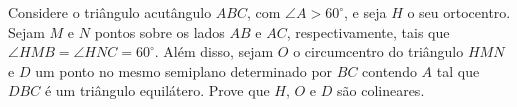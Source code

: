 Considere o triângulo acutângulo $ABC$, com $\angle A > 60^\circ$, e seja $H$ o seu ortocentro.
Sejam $M$ e $N$ pontos sobre os lados $AB$ e $AC$, respectivamente, tais que $\angle HMB = \angle HNC = 60^\circ$.
Além disso, sejam $O$ o circumcentro do triângulo $HMN$ e $D$ um ponto no mesmo semiplano determinado por $BC$ contendo $A$ tal que $DBC$ é um triângulo equilátero.
Prove que $H$, $O$ e $D$ são colineares.